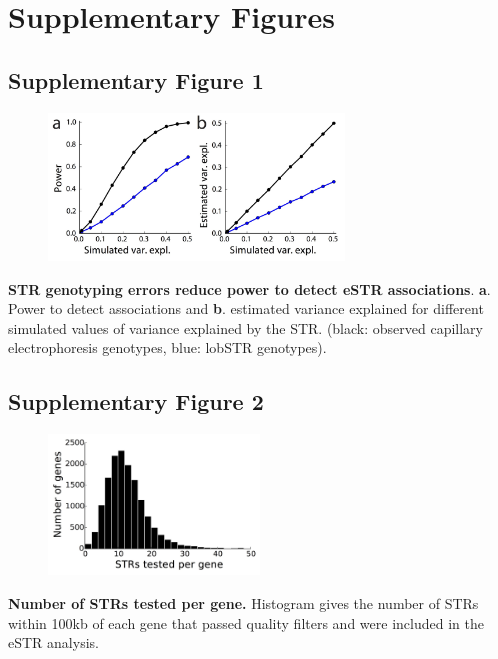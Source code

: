 \pagebreak
\section{Supplementary Figures}

\subsection{Supplementary Figure 1}
\begin{figure}[h!]
\centering
\label{fig:estrsupfig1}
\includegraphics[width=0.7\textwidth]{Figures/Chapter4/SuppFig1.jpg}
\end{figure}

\textbf{STR genotyping errors reduce power to detect eSTR associations}. \textbf{a}. Power to detect associations and \textbf{b}. estimated variance explained for different simulated values of variance explained by the STR. (black: observed capillary electrophoresis genotypes, blue: lobSTR genotypes).

\pagebreak
\subsection{Supplementary Figure 2}
\begin{figure}[h!]
\centering
\label{fig:estrsupfig2}
\includegraphics[width=0.5\textwidth]{Figures/Chapter4/SuppFig2.jpg}
\end{figure}

\textbf{Number of STRs tested per gene.} Histogram gives the number of STRs within 100kb of each gene that passed quality filters and were included in the eSTR analysis.

